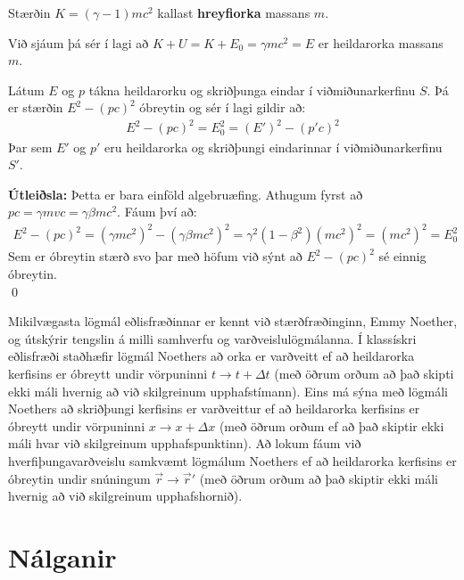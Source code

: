 \ifdefined \wholebook \else\documentclass[oneside]{book}\usepackage{EdlBook}\graphicspath{{figures/}}
\begin{document}
\begin{tcolorbox}
\begin{definition}
    Stærðin $K = (\gamma -1)mc^2$ kallast \textbf{hreyfiorka} massans $m$.
\end{definition}
\end{tcolorbox}
Við sjáum þá sér í lagi að $K + U = K + E_0 = \gamma mc^2 = E$ er heildarorka massans $m$.

\begin{tcolorbox}
\begin{theorem}
Látum $E$ og $p$ tákna heildarorku og skriðþunga eindar í viðmiðunarkerfinu $S$. Þá er stærðin $E^2 - (pc)^2$ óbreytin og sér í lagi gildir að:
\begin{align*}
E^2 - (pc)^2 = E_0^2 = (E')^2 - (p'c)^2
\end{align*}
Þar sem $E'$ og $p'$ eru heildarorka og skriðþungi eindarinnar í viðmiðunarkerfinu $S'$.
\end{theorem}
\end{tcolorbox}

\textbf{Útleiðsla:} Þetta er bara einföld algebruæfing. Athugum fyrst að $pc = \gamma mvc = \gamma \beta mc^2$. Fáum því að:
\begin{align*}
    E^2 - (pc)^2 = \left(\gamma mc^2 \right)^2 - (\gamma \beta mc^2)^2 = \gamma^2 \left( 1 - \beta^2\right)(mc^2)^2 = (mc^2)^2 = E_0^2
\end{align*}
Sem er óbreytin stærð svo þar með höfum við sýnt að $E^2 - (pc)^2$ sé einnig óbreytin. \\ \qed

Mikilvægasta lögmál eðlisfræðinnar er kennt við stærðfræðinginn, Emmy Noether, og útskýrir tengslin á milli samhverfu og varðveislulögmálanna. Í klassískri eðlisfræði staðhæfir lögmál Noethers að orka er varðveitt ef að heildarorka kerfisins er óbreytt undir vörpuninni $t \to t + \Delta t$ (með öðrum orðum að það skipti ekki máli hvernig að við skilgreinum upphafstímann). Eins má sýna með lögmáli Noethers að skriðþungi kerfisins er varðveittur ef að heildarorka kerfisins er óbreytt undir vörpuninni $x \to x + \Delta x$ (með öðrum orðum ef að það skiptir ekki máli hvar við skilgreinum upphafspunktinn). Að lokum fáum við hverfiþungavarðveislu samkvæmt lögmálum Noethers ef að heildarorka kerfisins er óbreytin undir snúningum $\Vec{r} \to \Vec{r}'$ (með öðrum orðum að það skiptir ekki máli hvernig að við skilgreinum upphafshornið).

\newpage


\section{Nálganir}
\end{document}
